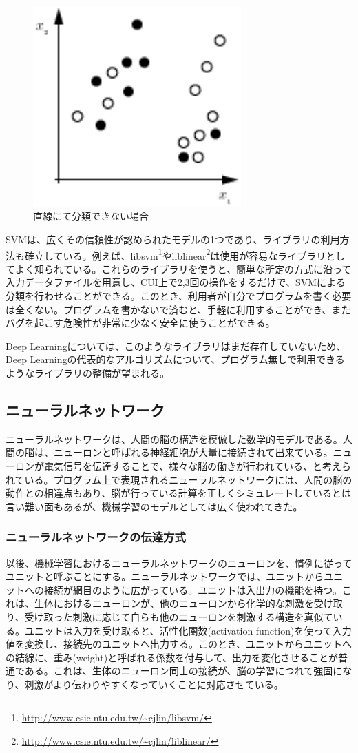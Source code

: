 \begin{figure}[tbp]
 \centering
  \includegraphics[width=80mm]{img/c2/svm_mixed}
 \caption{直線にて分類できない場合}
 \label{c2_svm_mixed}
\end{figure}
SVMは、広くその信頼性が認められたモデルの1つであり、ライブラリの利用方法も確立している。例えば、libsvm\footnote{\url{http://www.csie.ntu.edu.tw/~cjlin/libsvm/}}やliblinear\footnote{\url{http://www.csie.ntu.edu.tw/~cjlin/liblinear/}}は使用が容易なライブラリとしてよく知られている。これらのライブラリを使うと、簡単な所定の方式に沿って入力データファイルを用意し、CUI上で2,3回の操作をするだけで、SVMによる分類を行わせることができる。このとき、利用者が自分でプログラムを書く必要は全くない。プログラムを書かないで済むと、手軽に利用することができ、またバグを起こす危険性が非常に少なく安全に使うことができる。\par
Deep Learningについては、このようなライブラリはまだ存在していないため、Deep Learningの代表的なアルゴリズムについて、プログラム無しで利用できるようなライブラリの整備が望まれる。
\subsection{ニューラルネットワーク}
ニューラルネットワークは、人間の脳の構造を模倣した数学的モデルである。人間の脳は、ニューロンと呼ばれる神経細胞が大量に接続されて出来ている。ニューロンが電気信号を伝達することで、様々な脳の働きが行われている、と考えられている。プログラム上で表現されるニューラルネットワークには、人間の脳の動作との相違点もあり、脳が行っている計算を正しくシミュレートしているとは言い難い面もある\cite{kawato1998}が、機械学習のモデルとしては広く使われてきた。\par
\subsubsection{ニューラルネットワークの伝達方式}
以後、機械学習におけるニューラルネットワークのニューロンを、慣例に従ってユニットと呼ぶことにする。ニューラルネットワークでは、ユニットからユニットへの接続が網目のように広がっている。ユニットは入出力の機能を持つ。これは、生体におけるニューロンが、他のニューロンから化学的な刺激を受け取り、受け取った刺激に応じて自らも他のニューロンを刺激する構造を真似ている。ユニットは入力を受け取ると、活性化関数(activation function)を使って入力値を変換し、接続先のユニットへ出力する。このとき、ユニットからユニットへの結線に、重み(weight)と呼ばれる係数を付与して、出力を変化させることが普通である。これは、生体のニューロン同士の接続が、脳の学習につれて強固になり、刺激がより伝わりやすくなっていくことに対応させている。
